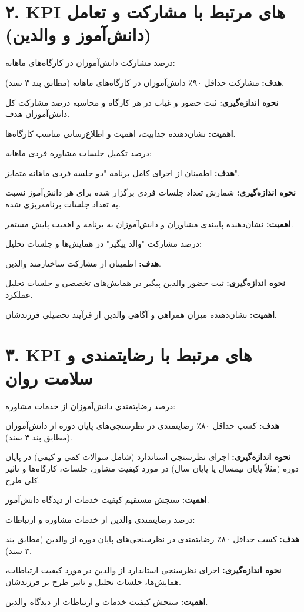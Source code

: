 \documentclass[12pt,a4paper]{article}
\newcommand{\kpiitem}[1]{\par\textbf{#1}}
\begin{document}
\vspace{1em}
\hrulefill
\vspace{1em}
\newpage
\section*{۲. KPI های مرتبط با مشارکت و تعامل (دانش‌آموز و والدین)}

 درصد مشارکت دانش‌آموزان در کارگاه‌های ماهانه:
\kpiitem{هدف:} مشارکت حداقل ۹۰٪ دانش‌آموزان در کارگاه‌های ماهانه (مطابق بند ۳ سند).
\kpiitem{نحوه اندازه‌گیری:} ثبت حضور و غیاب در هر کارگاه و محاسبه درصد مشارکت کل دانش‌آموزان هدف.
\kpiitem{اهمیت:} نشان‌دهنده جذابیت، اهمیت و اطلاع‌رسانی مناسب کارگاه‌ها.

\vspace{1em}
 درصد تکمیل جلسات مشاوره فردی ماهانه:
\kpiitem{هدف:} اطمینان از اجرای کامل برنامه "دو جلسه فردی ماهانه متمایز".
\kpiitem{نحوه اندازه‌گیری:} شمارش تعداد جلسات فردی برگزار شده برای هر دانش‌آموز نسبت به تعداد جلسات برنامه‌ریزی شده.
\kpiitem{اهمیت:} نشان‌دهنده پایبندی مشاوران و دانش‌آموزان به برنامه و اهمیت پایش مستمر.

\vspace{1em}
 درصد مشارکت "والد پیگیر" در همایش‌ها و جلسات تحلیل:
\kpiitem{هدف:} اطمینان از مشارکت ساختارمند والدین.
\kpiitem{نحوه اندازه‌گیری:} ثبت حضور والدین پیگیر در همایش‌های تخصصی و جلسات تحلیل عملکرد.
\kpiitem{اهمیت:} نشان‌دهنده میزان همراهی و آگاهی والدین از فرآیند تحصیلی فرزندشان.

\vspace{1em}
\hrulefill
\vspace{1em}

\section*{۳. KPI های مرتبط با رضایتمندی و سلامت روان}

 درصد رضایتمندی دانش‌آموزان از خدمات مشاوره:
\kpiitem{هدف:} کسب حداقل ۸۰٪ رضایتمندی در نظرسنجی‌های پایان دوره از دانش‌آموزان (مطابق بند ۳ سند).
\kpiitem{نحوه اندازه‌گیری:} اجرای نظرسنجی استاندارد (شامل سوالات کمی و کیفی) در پایان دوره (مثلاً پایان نیمسال یا پایان سال) در مورد کیفیت مشاور، جلسات، کارگاه‌ها و تاثیر کلی طرح.
\kpiitem{اهمیت:} سنجش مستقیم کیفیت خدمات از دیدگاه دانش‌آموز.

\vspace{1em}
 درصد رضایتمندی والدین از خدمات مشاوره و ارتباطات:
\kpiitem{هدف:} کسب حداقل ۸۰٪ رضایتمندی در نظرسنجی‌های پایان دوره از والدین (مطابق بند ۳ سند).
\kpiitem{نحوه اندازه‌گیری:} اجرای نظرسنجی استاندارد از والدین در مورد کیفیت ارتباطات، همایش‌ها، جلسات تحلیل و تاثیر طرح بر فرزندشان.
\kpiitem{اهمیت:} سنجش کیفیت خدمات و ارتباطات از دیدگاه والدین.
\end{document}
